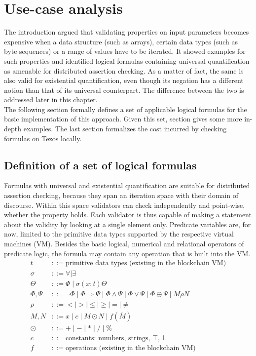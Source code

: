 \chapter{Use-case analysis}\label{chap:use_cases}
The introduction argued that validating properties on input parameters becomes expensive when a data structure (such as arrays), certain data types (such as byte sequences) or a range of values have to be iterated. It showed examples for such properties and identified logical formulas containing universal quantification as amenable for distributed assertion checking. As a matter of fact, the same is also valid for existential quantification, even though its negation has a different notion than that of its universal counterpart. The difference between the two is addressed later in this chapter. \\
The following section formally defines a set of applicable logical formulas for the basic implementation of this approach. Given this set, section  gives some more in-depth examples. The last section formalizes the cost incurred by checking formulas on Tezos locally. 

\section{Definition of a set of logical formulas}\label{sec:formulae}
Formulas with universal and existential quantification are suitable for distributed assertion checking, because they span an iteration space with their domain of discourse. Within this space validators can check independently and point-wise, whether the property holds. Each validator is thus capable of making a statement about the validity by looking at a single element only. Predicate variables are, for now, limited to the primitive data types supported by the respective virtual machines (VM). Besides the basic logical, numerical and relational operators of predicate logic, the formula may contain any operation that is built into the VM.
\begin{align*}
    t &::= \text{primitive data types (existing in the blockchain VM)} \\
    \sigma &::= \forall \mid \exists \\
    \Theta &::= \Phi \mid \sigma (x:t) \Theta \\
    \Phi,\Psi &::= \neg\Phi \mid \Phi \Rightarrow \Psi \mid \Phi\wedge\Psi \mid
    				\Phi\vee\Psi \mid \Phi \oplus \Psi \mid M \rho N \\
    \rho &::= < \mid > \mid \le \mid \ge \mid = \mid \ne \\
    M, N &::= x \mid c \mid M \odot N  \mid f (\overline M) \\
    \odot &::= +\mid -\mid * \mid / \mid \% \\
    c &::= \text{constants: numbers, strings, } \top, \bot \\
    f &::= \text{operations (existing in the blockchain VM)}
\end{align*}
\begingroup\vspace*{-\baselineskip}
\vspace*{\baselineskip}\endgroup

